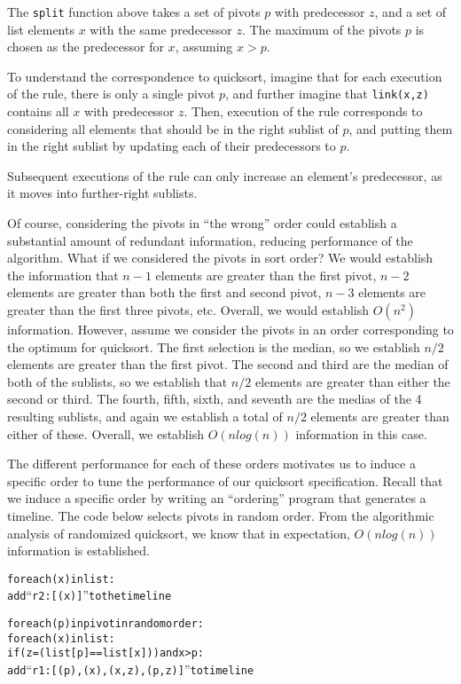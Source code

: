 The {\tt split} function above takes a set of pivots $p$ with predecessor $z$, and a set of list elements $x$ with the same predecessor $z$.  The maximum of the pivots $p$ is chosen as the predecessor for $x$, assuming $x > p$.

To understand the correspondence to quicksort, imagine that for each execution of the rule, there is only a single pivot $p$, and further imagine that {\tt link(x,z)} contains all $x$ with predecessor $z$.  Then, execution of the rule corresponds to considering all elements that should be in the right sublist of $p$, and putting them in the right sublist by updating each of their predecessors to $p$.  

Subsequent executions of the rule can only increase an element's predecessor, as it moves into further-right sublists.

Of course, considering the pivots in ``the wrong'' order could establish a substantial amount of redundant information, reducing performance of the algorithm.  What if we considered the pivots in sort order?  We would establish the information that $n-1$ elements are greater than the first pivot, $n-2$ elements are greater than both the first and second pivot, $n-3$ elements are greater than the first three pivots, etc.  Overall, we would establish $O(n^2)$ information.  However, assume we consider the pivots in an order corresponding to the optimum for quicksort.  The first selection is the median, so we establish $n/2$ elements are greater than the first pivot.  The second and third are the median of both of the sublists, so we establish that $n/2$ elements are greater than either the second or third.  The fourth, fifth, sixth, and seventh are the medias of the 4 resulting sublists, and again we establish a total of $n/2$ elements are greater than either of these.  Overall, we establish $O(n log(n))$ information in this case.

The different performance for each of these orders motivates us to induce a specific order to tune the performance of our quicksort specification.  Recall that we induce a specific order by writing an ``ordering'' program that generates a timeline.  The code below selects pivots in random order.  From the algorithmic analysis of randomized quicksort, we know that in expectation, $O(n log(n))$ information is established.

\begin{alltt}
for each (x) in list:
    add ``r2 : [(x)]'' to the timeline

for each (p) in pivot in random order:
    for each (x) in list:
        if (z = (list[p] == list[x])) and x > p:
            add ``r1 : [(p),(x),(x,z),(p,z)]'' to timeline
\end{alltt}

